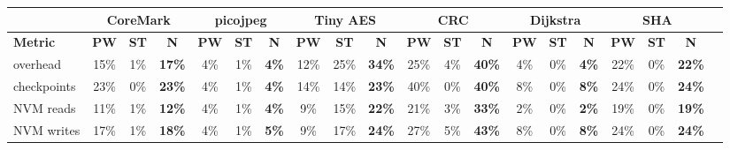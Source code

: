 \begin{tabular}{@{}l|ccccccccccccccccccc@{}}
\toprule
 & \multicolumn{3}{c}{\textbf{\textsf{CoreMark}}} & \multicolumn{3}{c}{\textbf{\textsf{picojpeg}}} & \multicolumn{3}{c}{\textbf{\textsf{Tiny AES}}} & \multicolumn{3}{c}{\textbf{\textsf{CRC}}} & \multicolumn{3}{c}{\textbf{\textsf{Dijkstra}}} & \multicolumn{3}{c}{\textbf{\textsf{SHA}}} \\ \midrule
\textbf{Metric} & \textbf{\textsf{PW}} & \textbf{\textsf{ST}} & \textbf{\textsf{N}} & \textbf{\textsf{PW}} & \textbf{\textsf{ST}} & \textbf{\textsf{N}} & \textbf{\textsf{PW}} & \textbf{\textsf{ST}} & \textbf{\textsf{N}} & \textbf{\textsf{PW}} & \textbf{\textsf{ST}} & \textbf{\textsf{N}} & \textbf{\textsf{PW}} & \textbf{\textsf{ST}} & \textbf{\textsf{N}} & \textbf{\textsf{PW}} & \textbf{\textsf{ST}} & \textbf{\textsf{N}} \\
overhead & 15\% & \hphantom{0}1\% & \textbf{\colorbox{hightlight!46!white}{17\%}} & \hphantom{0}4\% & \hphantom{0}1\% & \textbf{\colorbox{hightlight!34!white}{\hphantom{0}4\%}} & 12\% & 25\% & \textbf{\colorbox{hightlight!63!white}{34\%}} & 25\% & \hphantom{0}4\% & \textbf{\colorbox{hightlight!70!white}{40\%}} & \hphantom{0}4\% & \hphantom{0}0\% & \textbf{\colorbox{hightlight!33!white}{\hphantom{0}4\%}} & 22\% & \hphantom{0}0\% & \textbf{\colorbox{hightlight!51!white}{22\%}} \\
checkpoints & 23\% & \hphantom{0}0\% & \textbf{\colorbox{hightlight!53!white}{23\%}} & \hphantom{0}4\% & \hphantom{0}1\% & \textbf{\colorbox{hightlight!33!white}{\hphantom{0}4\%}} & 14\% & 14\% & \textbf{\colorbox{hightlight!52!white}{23\%}} & 40\% & \hphantom{0}0\% & \textbf{\colorbox{hightlight!70!white}{40\%}} & \hphantom{0}8\% & \hphantom{0}0\% & \textbf{\colorbox{hightlight!38!white}{\hphantom{0}8\%}} & 24\% & \hphantom{0}0\% & \textbf{\colorbox{hightlight!54!white}{24\%}} \\
NVM reads & 11\% & \hphantom{0}1\% & \textbf{\colorbox{hightlight!42!white}{12\%}} & \hphantom{0}4\% & \hphantom{0}1\% & \textbf{\colorbox{hightlight!33!white}{\hphantom{0}4\%}} & \hphantom{0}9\% & 15\% & \textbf{\colorbox{hightlight!51!white}{22\%}} & 21\% & \hphantom{0}3\% & \textbf{\colorbox{hightlight!62!white}{33\%}} & \hphantom{0}2\% & \hphantom{0}0\% & \textbf{\colorbox{hightlight!32!white}{\hphantom{0}2\%}} & 19\% & \hphantom{0}0\% & \textbf{\colorbox{hightlight!49!white}{19\%}} \\
NVM writes & 17\% & \hphantom{0}1\% & \textbf{\colorbox{hightlight!48!white}{18\%}} & \hphantom{0}4\% & \hphantom{0}1\% & \textbf{\colorbox{hightlight!34!white}{\hphantom{0}5\%}} & \hphantom{0}9\% & 17\% & \textbf{\colorbox{hightlight!53!white}{24\%}} & 27\% & \hphantom{0}5\% & \textbf{\colorbox{hightlight!72!white}{43\%}} & \hphantom{0}8\% & \hphantom{0}0\% & \textbf{\colorbox{hightlight!38!white}{\hphantom{0}8\%}} & 24\% & \hphantom{0}0\% & \textbf{\colorbox{hightlight!53!white}{24\%}} \\
 \bottomrule
\end{tabular}
